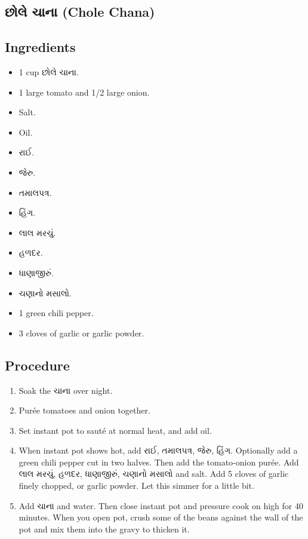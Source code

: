 \documentclass[../../recipes.tex]{subfiles}
\begin{document}
\begin{gujarati}

\chapter{છોલે ચાના (Chole Chana)}

\section*{Ingredients}

\begin{itemize}
    \item 1 cup છોલે ચાના.
    \item 1 large tomato and 1/2 large onion.
    \item Salt.
    \item Oil.
    \item રાઈ.
    \item જેરુ.
    \item તમાલપત્ર.
    \item હિંગ.
    \item લાલ મરચું.
    \item હળદર.
    \item ધાણાજીરું.
    \item ચણાનો મસાલો.
    \item 1 green chili pepper.
    \item 3 cloves of garlic or garlic powder.
\end{itemize}

\noindent
\section*{Procedure}

\begin{enumerate}
    \item Soak the ચાના over night.
    \item Purée tomatoes and onion together.
    \item Set instant pot to sauté at normal heat, and add oil.
    \item When instant pot shows hot, add રાઈ, તમાલપત્ર, જેરુ, હિંગ. Optionally add a green chili pepper cut in two halves. Then add the tomato-onion purée. Add લાલ મરચું, હળદર, ધાણાજીરું, ચણાનો મસાલો and salt. Add 5 cloves of garlic finely chopped, or garlic powder. Let this simmer for a little bit.
    \item Add ચાના and water. Then close instant pot and pressure cook on high for 40 minutes. When you open pot, crush some of the beans against the wall of the pot and mix them into the gravy to thicken it.
\end{enumerate}

\end{gujarati}
\end{document}
